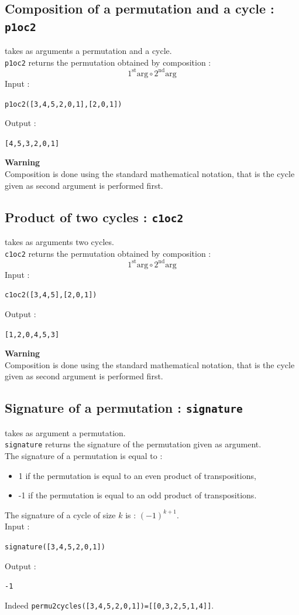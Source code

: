 \documentclass[a4paper,11pt]{book}
\begin{document}
\subsection{Composition of a permutation and a cycle : {\tt p1oc2}}
 takes as arguments a permutation and a cycle.\\
{\tt p1oc2} returns the  permutation obtained by composition :
\[ 1^{\mbox{st}}\mbox{arg} \circ 2^{\mbox{nd}} \mbox{arg} \]
Input :
\begin{center}{\tt p1oc2([3,4,5,2,0,1],[2,0,1])}\end{center}
Output :
\begin{center}{\tt [4,5,3,2,0,1]}\end{center}
{\bf Warning}\\
Composition is done using the standard mathematical notation,
that is the cycle given as second argument is performed first.

\subsection{Product of two cycles : {\tt c1oc2}}
 takes as arguments two cycles.\\
{\tt c1oc2} returns the permutation obtained by composition :
\[ 1^{\mbox{st}}\mbox{arg} \circ 2^{\mbox{nd}} \mbox{arg} \]
Input :
\begin{center}{\tt c1oc2([3,4,5],[2,0,1])}\end{center}
Output :
\begin{center}{\tt [1,2,0,4,5,3]}\end{center}
{\bf Warning}\\
Composition is done using the standard mathematical notation,
that is the cycle given as second argument is performed first.

\subsection{Signature of a permutation : {\tt signature}}
 takes as argument a permutation.\\
{\tt signature} returns the signature of the permutation given as argument.\\
The signature of a permutation is equal to :
\begin{itemize}
\item 1 if the permutation is equal to an even product of transpositions,
\item -1 if the permutation is equal to an odd product of transpositions.
\end{itemize}
The signature of a cycle of size $k$ is : $(-1)^{k+1}$.\\ 
 Input :
\begin{center}{\tt signature([3,4,5,2,0,1])}\end{center}
Output :
\begin{center}{\tt -1}\end{center}
Indeed {\tt permu2cycles([3,4,5,2,0,1])=[[0,3,2,5,1,4]]}.
\end{document}
